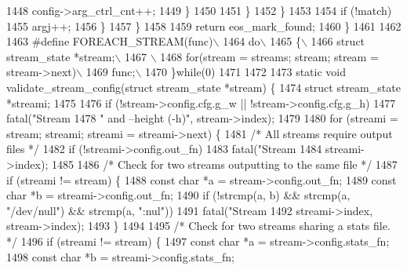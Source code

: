 \begin{DoxyCodeInclude}
{{{{{{{{{{{{{{{{{{{{{{{{{{{{{{{{{{{{{1448               config->arg\_ctrl\_cnt++;
1449           \}
1450 
1451         \}
1452       \}
1453 
1454       \textcolor{keywordflow}{if} (!match)
1455         argj++;
1456     \}
1457   \}
1458 
1459   \textcolor{keywordflow}{return} eos\_mark\_found;
1460 \}
1461 
1462 
1463 \textcolor{preprocessor}{#define FOREACH\_STREAM(func)\(\backslash\)}
1464 \textcolor{preprocessor}{  do\(\backslash\)}
1465 \textcolor{preprocessor}{  \{\(\backslash\)}
1466 \textcolor{preprocessor}{    struct stream\_state  *stream;\(\backslash\)}
1467 \textcolor{preprocessor}{    \(\backslash\)}
1468 \textcolor{preprocessor}{    for(stream = streams; stream; stream = stream->next)\(\backslash\)}
1469 \textcolor{preprocessor}{      func;\(\backslash\)}
1470 \textcolor{preprocessor}{  \}while(0)}
1471 
1472 
1473 \textcolor{keyword}{static} \textcolor{keywordtype}{void} validate\_stream\_config(\textcolor{keyword}{struct} stream\_state *stream) \{
1474   \textcolor{keyword}{struct }stream\_state *streami;
1475 
1476   \textcolor{keywordflow}{if} (!stream->config.cfg.g\_w || !stream->config.cfg.g\_h)
1477     fatal(\textcolor{stringliteral}{"Stream %
1478           \textcolor{stringliteral}{" and --height (-h)"}, stream->index);
1479 
1480   \textcolor{keywordflow}{for} (streami = stream; streami; streami = streami->next) \{
1481     \textcolor{comment}{/* All streams require output files */}
1482     \textcolor{keywordflow}{if} (!streami->config.out\_fn)
1483       fatal(\textcolor{stringliteral}{"Stream %
1484             streami->index);
1485 
1486     \textcolor{comment}{/* Check for two streams outputting to the same file */}
1487     \textcolor{keywordflow}{if} (streami != stream) \{
1488       \textcolor{keyword}{const} \textcolor{keywordtype}{char} *a = stream->config.out\_fn;
1489       \textcolor{keyword}{const} \textcolor{keywordtype}{char} *b = streami->config.out\_fn;
1490       \textcolor{keywordflow}{if} (!strcmp(a, b) && strcmp(a, \textcolor{stringliteral}{"/dev/null"}) && strcmp(a, \textcolor{stringliteral}{":nul"}))
1491         fatal(\textcolor{stringliteral}{"Stream %
1492               streami->index, stream->index);
1493     \}
1494 
1495     \textcolor{comment}{/* Check for two streams sharing a stats file. */}
1496     \textcolor{keywordflow}{if} (streami != stream) \{
1497       \textcolor{keyword}{const} \textcolor{keywordtype}{char} *a = stream->config.stats\_fn;
1498       \textcolor{keyword}{const} \textcolor{keywordtype}{char} *b = streami->config.stats\_fn;
}}}}}}}}}}}}}}}}}}}}}}}}}}}}}}}}}}}}}}}}
\end{DoxyCodeInclude}
